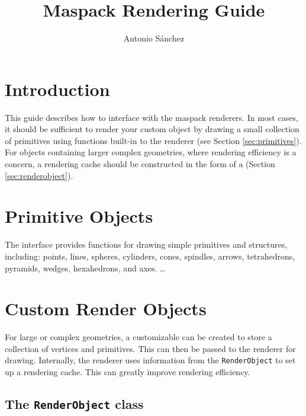 \documentclass{article}
\title{Maspack Rendering Guide}
\author{Antonio S\'anchez}
\date{}
\begin{document}
\maketitle

\iflatexml{\large\pubdate}\fi

\tableofcontents


\section{Introduction}

This guide describes how to interface with the maspack renderers.  In most cases,
it should be sufficient to render your custom object by drawing a small collection of 
primitives using functions built-in to the renderer (see Section \ref{sec:primitives}).
For objects containing larger complex geometries, where rendering efficiency
is a concern, a rendering cache should be constructed in the form of a 
 (Section \ref{sec:renderobject}).

\section{Primitive Objects \label{sec:primitives}}

The  interface provides functions for drawing simple
primitives and structures, including: points, lines, spheres, cylinders,
cones, spindles, arrows, tetrahedrons, pyramids, wedges, hexahedrons,
and axes.  \ldots

\section{Custom Render Objects}

For large or complex geometries, a customizable  can be 
created to store a collection of vertices and primitives.  This can then be
passed to the renderer for drawing.  Internally, the renderer uses information
from the \lstinline{RenderObject} to set up a rendering cache.  This can greatly improve
rendering efficiency.

\subsection{The \texttt{RenderObject} class \label{sec:renderobject}}
\end{document}
